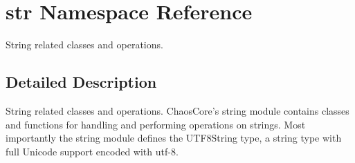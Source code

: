 \hypertarget{namespacestr}{\section{str Namespace Reference}
\label{namespacestr}
}


String related classes and operations.  




\subsection{Detailed Description}
String related classes and operations. Chaos\-Core's string module contains classes and functions for handling and performing operations on strings. Most importantly the string module defines the U\-T\-F8\-String type, a string type with full Unicode support encoded with utf-\/8. 